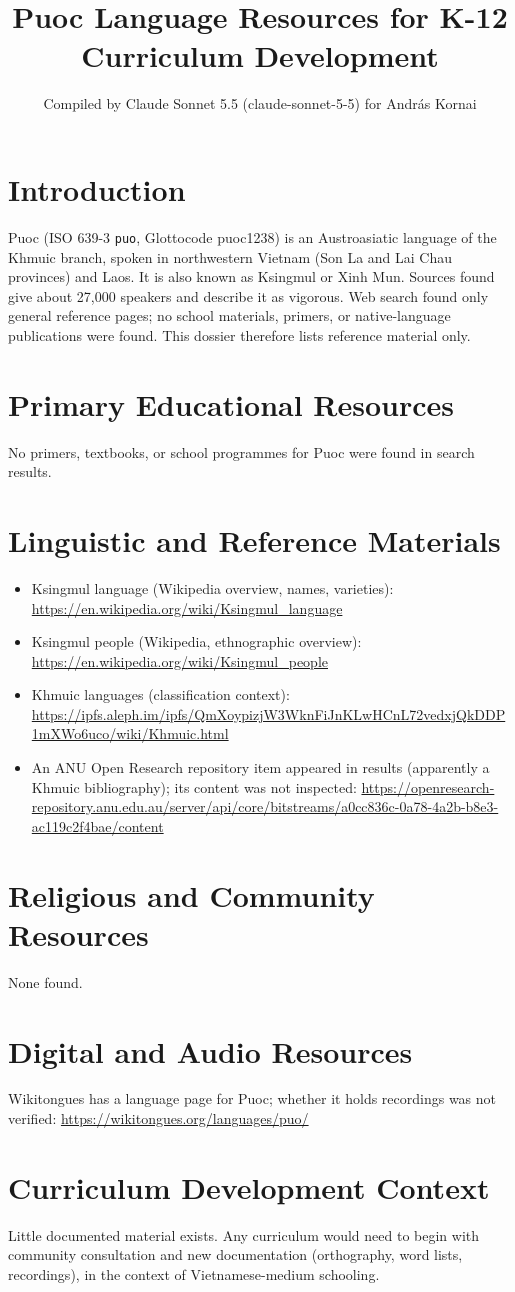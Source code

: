 \documentclass[12pt]{article}
\title{Puoc Language Resources for K-12 Curriculum Development}
\author{Compiled by Claude Sonnet 5.5 (claude-sonnet-5-5) for Andr\'as Kornai}
\date{}
\begin{document}
\maketitle

\section{Introduction}
Puoc (ISO 639-3 \texttt{puo}, Glottocode puoc1238) is an Austroasiatic language of the Khmuic branch, spoken in northwestern Vietnam (Son La and Lai Chau provinces) and Laos. It is also known as Ksingmul or Xinh Mun. Sources found give about 27,000 speakers and describe it as vigorous. Web search found only general reference pages; no school materials, primers, or native-language publications were found. This dossier therefore lists reference material only.

\section{Primary Educational Resources}
No primers, textbooks, or school programmes for Puoc were found in search results.

\section{Linguistic and Reference Materials}
\begin{itemize}
\item Ksingmul language (Wikipedia overview, names, varieties): \url{https://en.wikipedia.org/wiki/Ksingmul_language}
\item Ksingmul people (Wikipedia, ethnographic overview): \url{https://en.wikipedia.org/wiki/Ksingmul_people}
\item Khmuic languages (classification context): \url{https://ipfs.aleph.im/ipfs/QmXoypizjW3WknFiJnKLwHCnL72vedxjQkDDP1mXWo6uco/wiki/Khmuic.html}
\item An ANU Open Research repository item appeared in results (apparently a Khmuic bibliography); its content was not inspected: \url{https://openresearch-repository.anu.edu.au/server/api/core/bitstreams/a0cc836c-0a78-4a2b-b8e3-ac119c2f4bae/content}
\end{itemize}

\section{Religious and Community Resources}
None found.

\section{Digital and Audio Resources}
Wikitongues has a language page for Puoc; whether it holds recordings was not verified: \url{https://wikitongues.org/languages/puo/}

\section{Curriculum Development Context}
Little documented material exists. Any curriculum would need to begin with community consultation and new documentation (orthography, word lists, recordings), in the context of Vietnamese-medium schooling.
\end{document}
